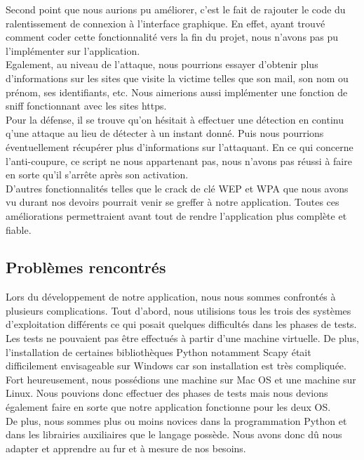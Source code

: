\documentclass[11pt]{article}
\begin{document}
Second point que nous aurions pu améliorer, c'est le fait de rajouter le code du ralentissement de connexion à l'interface graphique. En effet, ayant trouvé comment coder cette fonctionnalité vers la fin du projet, nous n'avons pas pu l'implémenter sur l'application.~\\

Egalement, au niveau de l'attaque, nous pourrions essayer d'obtenir plus d'informations sur les sites que visite la victime telles que son mail, son nom ou prénom, ses identifiants, etc. Nous aimerions aussi implémenter une fonction de sniff fonctionnant avec les sites https.~\\

Pour la défense, il se trouve qu'on hésitait à effectuer une détection en continu q'une attaque au lieu de détecter à un instant donné. Puis nous pourrions éventuellement récupérer plus d'informations sur l'attaquant. En ce qui concerne l'anti-coupure, ce script ne nous appartenant pas, nous n'avons pas réussi à faire en sorte qu'il s'arrête après son activation.~\\

D'autres fonctionnalités telles que le crack de clé WEP et WPA que nous avons vu durant nos devoirs pourrait venir se greffer à notre application. Toutes ces améliorations permettraient avant tout de rendre l'application plus complète et fiable.

\subsection{Problèmes rencontrés}
Lors du développement de notre application, nous nous sommes confrontés à plusieurs complications. Tout d'abord, nous utilisions tous les trois des systèmes d'exploitation différents ce qui posait quelques difficultés dans les phases de tests. Les tests ne pouvaient pas être effectués à partir d'une machine virtuelle. De plus, l'installation de certaines bibliothèques Python notamment Scapy était difficilement envisageable sur Windows car son installation est très compliquée.~\\

Fort heureusement, nous possédions une machine sur Mac OS et une machine sur Linux. Nous pouvions donc effectuer des phases de tests mais nous devions également faire en sorte que notre application fonctionne pour les deux OS.~\\

De plus, nous sommes plus ou moins novices dans la programmation Python et dans les librairies auxiliaires que le langage possède. Nous avons donc dû nous adapter et apprendre au fur et à mesure de nos besoins.
\end{document}
